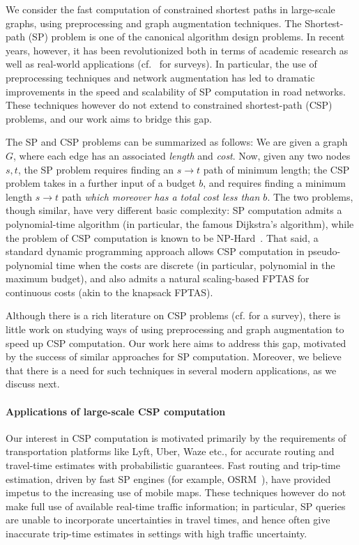 We consider the fast computation of constrained shortest paths in large-scale graphs, using preprocessing and graph augmentation techniques.
The Shortest-path (SP) problem is one of the canonical algorithm design problems.
In recent years, however, it has been revolutionized both in terms of academic research as well as real-world applications (cf.~\cite{goldberg_survey,dimacs09} for surveys).
In particular, the use of preprocessing techniques and network augmentation has led to dramatic improvements in the speed and scalability of SP computation in road networks.
These techniques however do not extend to constrained shortest-path (CSP) problems, and our work aims to bridge this gap.

The SP and CSP problems can be summarized as follows: We are given a graph $G$, where each edge has an associated \emph{length} and \emph{cost}. 
Now, given any two nodes $s,t$, the SP problem requires finding an  $s\rightarrow t$ path of minimum length; the CSP problem takes in a further input of a budget $b$, and requires finding a minimum length $s\rightarrow t$ path \emph{which moreover has a total cost less than $b$}.
The two problems, though similar, have very different basic complexity: SP computation admits a polynomial-time algorithm (in particular, the famous Dijkstra's algorithm), while the problem of CSP computation is known to be NP-Hard~\cite{csp_survey}.
That said, a standard dynamic programming approach allows CSP computation in pseudo-polynomial time when the costs are discrete (in particular, polynomial in the maximum budget), and also admits a natural scaling-based FPTAS for continuous costs (akin to the knapsack FPTAS).

Although there is a rich literature on CSP problems (cf. \cite{csp_survey} for a survey), there is little work on studying ways of using preprocessing and graph augmentation to speed up CSP computation. Our work here aims to address this gap, motivated by the success of similar approaches for SP computation. Moreover, we believe that there is a need for such techniques in several modern applications, as we discuss next. 


\paragraph*{Applications of large-scale CSP computation}

Our interest in CSP computation is motivated primarily by the requirements of transportation platforms like Lyft, Uber, Waze etc., for accurate routing and travel-time estimates with probabilistic guarantees.
Fast routing and trip-time estimation, driven by fast SP engines (for example, OSRM~\cite{OSRM}), have provided impetus to the increasing use of mobile maps.
These techniques however do not make full use of available real-time traffic information; in particular, SP queries are unable to incorporate uncertainties in travel times, and hence often give inaccurate trip-time estimates in settings with high traffic uncertainty.


